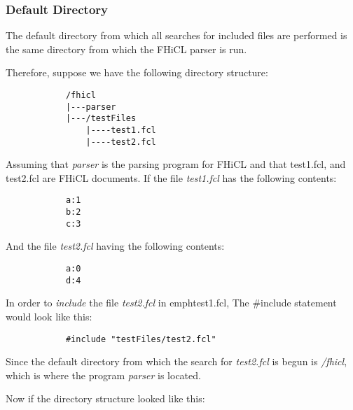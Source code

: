 \documentclass{memarticle}
\begin{document}
{                        \subsubsection{Default Directory}
                                The default directory from which all searches for included files are performed
                                is the same directory from which the FHiCL parser is run.
                                \par
                                Therefore, suppose we have the following directory structure:
                                \begin{verbatim}
            /fhicl
            |---parser
            |---/testFiles
                |----test1.fcl
                |----test2.fcl
                                \end{verbatim}
                                \par
                                Assuming that \emph{parser} is the parsing program for FHiCL
                                and that test1.fcl, and test2.fcl are FHiCL documents.
                                If the file \emph{test1.fcl} has the following contents:
                                \begin{verbatim}
            a:1
            b:2
            c:3
                                \end{verbatim}
                                And the file \emph{test2.fcl} having the following contents:
                                \begin{verbatim}
            a:0
            d:4
                                \end{verbatim}
                                In order to \emph{include} the file \emph{test2.fcl} in emph{test1.fcl},
                                The \#include statement would look like this:
                                \begin{verbatim}
            #include "testFiles/test2.fcl"
                                \end{verbatim}
                                Since the default directory from which the search for \emph{test2.fcl} is begun
                                is \emph{/fhicl}, which is where the program \emph{parser} is located.
                                \par
                                Now if the directory structure looked like this:
}
\end{document}
